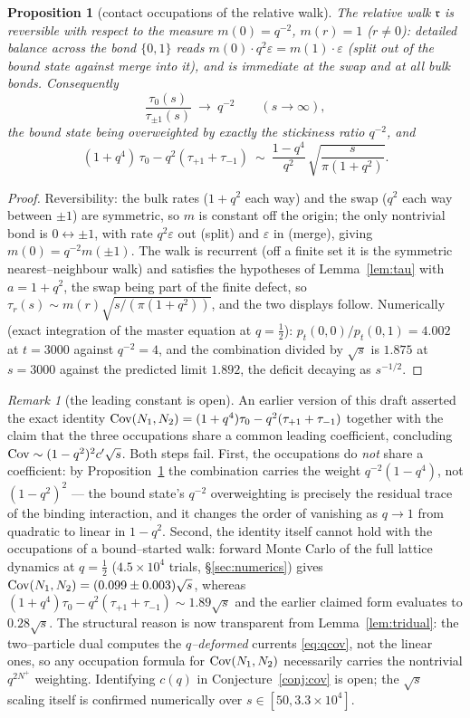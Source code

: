 \documentclass[11pt]{article}
\theoremstyle{plain}
\newtheorem{proposition}[theorem]{Proposition}
\theoremstyle{definition}
\theoremstyle{remark}
\newtheorem{remark}[theorem]{Remark}
\newcommand{\eps}{\varepsilon}\newcommand{\Exp}{\mathrm{Exp}}
\begin{document}
\begin{proposition}[contact occupations of the relative walk]\label{prop:occ}
The relative walk $\mathfrak r$ is reversible with respect to the measure
$m(0)=q^{-2}$, $m(r)=1$ \textup($r\ne0$\textup): detailed balance across the bond
$\{0,1\}$ reads $m(0)\cdot q^2\eps=m(1)\cdot\eps$ \textup(split out of the bound state
against merge into it\textup), and is immediate at the swap and at all bulk bonds.
Consequently
\[
  \frac{\tau_0(s)}{\tau_{\pm1}(s)}\ \longrightarrow\ q^{-2}\qquad(s\to\infty),
\]
the bound state being overweighted by exactly the stickiness ratio $q^{-2}$, and
\[
  (1+q^4)\,\tau_0-q^2(\tau_{+1}+\tau_{-1})\ \sim\
  \frac{1-q^4}{q^{2}}\,\sqrt{\frac{s}{\pi(1+q^2)}}.
\]
\end{proposition}
\begin{proof}
Reversibility: the bulk rates ($1+q^2$ each way) and the swap ($q^2$ each way between
$\pm1$) are symmetric, so $m$ is constant off the origin; the only nontrivial bond is
$0\leftrightarrow\pm1$, with rate $q^2\eps$ out (split) and $\eps$ in (merge), giving
$m(0)=q^{-2}m(\pm1)$. The walk is recurrent (off a finite set it is the symmetric
nearest--neighbour walk) and satisfies the hypotheses of Lemma~\ref{lem:tau} with
$a=1+q^2$, the swap being part of the finite defect, so
$\tau_r(s)\sim m(r)\sqrt{s/(\pi(1+q^2))}$, and the two displays follow.
Numerically (exact integration of the master equation at $q=\tfrac12$):
$p_t(0,0)/p_t(0,1)=4.002$ at $t=3000$ against $q^{-2}=4$, and the combination divided
by $\sqrt s$ is $1.875$ at $s=3000$ against the predicted limit $1.892$, the deficit
decaying as $s^{-1/2}$.
\end{proof}

\begin{remark}[the leading constant is open]\label{rem:covconst}
An earlier version of this draft asserted the exact identity
$\operatorname{Cov}(N_1,N_2)=(1+q^4)\tau_0-q^2(\tau_{+1}+\tau_{-1})$ together with the claim that the
three occupations share a common leading coefficient, concluding
$\operatorname{Cov}\sim(1-q^2)^2c'\sqrt s$. Both steps fail. First, the occupations do \emph{not}
share a coefficient: by Proposition~\ref{prop:occ} the combination carries the weight
$q^{-2}(1-q^4)$, not $(1-q^2)^2$ --- the bound state's $q^{-2}$ overweighting is
precisely the residual trace of the binding interaction, and it changes the order of
vanishing as $q\to1$ from quadratic to linear in $1-q^2$. Second, the identity itself
cannot hold with the occupations of a bound--started walk: forward Monte Carlo of the
full lattice dynamics at $q=\tfrac12$ ($4.5\times10^4$ trials, \S\ref{sec:numerics})
gives $\operatorname{Cov}(N_1,N_2)=(0.099\pm0.003)\sqrt s$, whereas
$(1+q^4)\tau_0-q^2(\tau_{+1}+\tau_{-1})\sim1.89\sqrt s$ and the earlier claimed form
evaluates to $0.28\sqrt s$. The structural reason is now transparent from
Lemma~\ref{lem:tridual}: the two--particle dual computes the \emph{$q$--deformed}
currents \eqref{eq:qcov}, not the linear ones, so any occupation formula for
$\operatorname{Cov}(N_1,N_2)$ necessarily carries the nontrivial $q^{2N^+}$ weighting. Identifying
$c(q)$ in Conjecture~\ref{conj:cov} is open; the $\sqrt s$ scaling itself is
confirmed numerically over $s\in[50,3.3\times10^4]$.
\end{remark}
\end{document}
